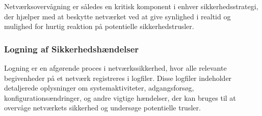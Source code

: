 \noindent
Netværksovervågning er således en kritisk komponent i enhver sikkerhedsstrategi, der hjælper med at beskytte netværket ved at give synlighed i realtid og mulighed for hurtig reaktion på potentielle sikkerhedstrusler.


\subsubsection{Logning af Sikkerhedshændelser}
Logning er en afgørende proces i netværkssikkerhed, hvor alle relevante begivenheder på et netværk registreres i logfiler. Disse logfiler indeholder detaljerede oplysninger om systemaktiviteter, adgangsforsøg, konfigurationsændringer, og andre vigtige hændelser, der kan bruges til at overvåge netværkets sikkerhed og undersøge potentielle trusler. 

